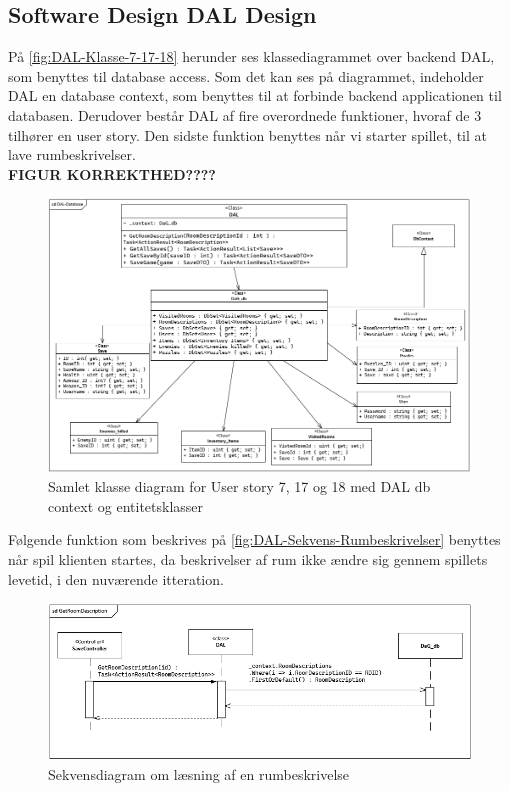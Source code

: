 \subsection{Software Design DAL Design}
På \autoref{fig:DAL-Klasse-7-17-18} herunder ses klassediagrammet over backend DAL, som benyttes til database access. 
Som det kan ses på diagrammet, indeholder DAL en database context, som benyttes til at forbinde backend applicationen til databasen. 
Derudover består DAL af fire overordnede funktioner, hvoraf de 3 tilhører en user story. 
Den sidste funktion benyttes når vi starter spillet, til at lave rumbeskrivelser.\\

\textbf{FIGUR KORREKTHED????}

\begin{figure}[H]
\centering
\includegraphics[width = \textwidth]{02-Body/Images/DAL-Database/DAL-DB-CD.PNG}
\caption{Samlet klasse diagram for User story 7, 17 og 18 med DAL db context og entitetsklasser}
\label{fig:DAL-Klasse-7-17-18}
\end{figure}

Følgende funktion som beskrives på \autoref{fig:DAL-Sekvens-Rumbeskrivelser} benyttes når spil klienten startes, da beskrivelser af rum ikke ændre sig gennem spillets levetid, i den nuværende itteration.\\

\begin{figure}[H]
\centering
\includegraphics[width = \textwidth]{02-Body/Images/DAL-Database/RoomDescriptionSd.PNG}
\caption{Sekvensdiagram om læsning af en rumbeskrivelse}
\label{fig:DAL-Sekvens-RumBeskrivelser}
\end{figure}


